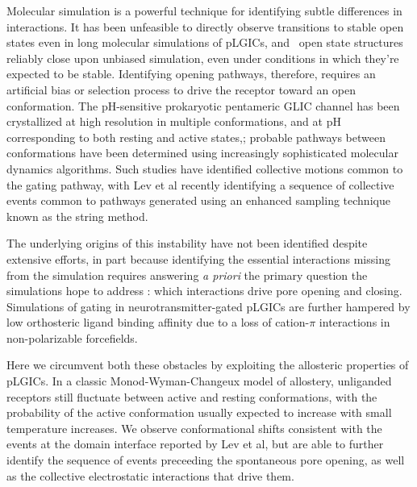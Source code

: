 \documentclass[9pt,twocolumn,twoside,lineno]{pnas-new}
\begin{document}
Molecular simulation is a powerful technique for identifying subtle differences in interactions.  It has been unfeasible to directly observe transitions to stable open states even in long molecular simulations of pLGICs, and %
\plgic~open state structures reliably close upon unbiased simulation, even under conditions in which they're expected to be stable. \cite{Brannigan2008, Willenbring2011,LeBard2012,Yoluk2013} Identifying opening pathways, therefore, requires an artificial bias or selection process to drive the receptor toward an open conformation.
The pH-sensitive prokaryotic pentameric GLIC channel has been crystallized at high resolution in multiple conformations, and at pH corresponding to both resting and active states,\cite{Bocquet2009, Gonzalez-Gutierrez2013,Sauguet2014};  probable pathways between conformations have been determined using increasingly sophisticated molecular dynamics algorithms.\cite{Nury2010,Zhu2010,Calimet2013,Lev2017} Such studies have identified collective motions common to the gating pathway, with Lev et al\cite{Lev2017} recently identifying a sequence of collective events common to pathways generated using an enhanced sampling technique known as the string method.    

The underlying origins of this instability have not been identified despite extensive efforts, in part because identifying the essential interactions missing from the simulation requires answering {\it a priori} the primary question the simulations hope to address : which interactions drive pore opening and closing. Simulations of gating in neurotransmitter-gated pLGICs are further hampered by low orthosteric ligand binding affinity due to a loss of cation-$\pi$ interactions in non-polarizable forcefields.

Here we circumvent both these obstacles by exploiting the allosteric properties of pLGICs. In a classic Monod-Wyman-Changeux\cite{Changeux2011,Changeux2016} model of allostery, unliganded receptors still fluctuate between active and resting conformations, with the probability of the active conformation usually expected to increase with small temperature increases. %
We observe conformational shifts consistent with the events at the domain interface reported by Lev et al\cite{Lev2017}, but are able to further identify the sequence of events preceeding the spontaneous pore opening, as well as the collective electrostatic interactions that drive them.  
\end{document}
